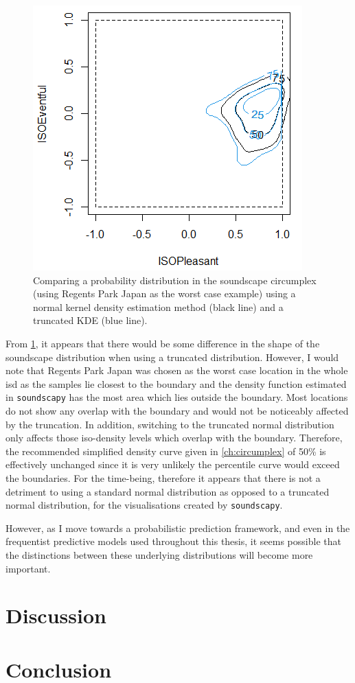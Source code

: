 \begin{figure}
  \centering
  \includegraphics{Figures/Trunc-Normal-demo.png}
  \caption{Comparing a probability distribution in the soundscape circumplex (using Regents Park Japan as the worst case example) using a normal kernel density estimation method (black line) and a truncated KDE (blue line). \label{fig:truncatekde}}
\end{figure}

From \cref{fig:truncatekde}, it appears that there would be some difference in the shape of the soundscape distribution when using a truncated distribution. However, I would note that Regents Park Japan was chosen as the worst case location in the whole \gls{isd} as the samples lie closest to the boundary and the density function estimated in \texttt{soundscapy} has the most area which lies outside the boundary. Most locations do not show any overlap with the boundary and would not be noticeably affected by the truncation. In addition, switching to the truncated normal distribution only affects those iso-density levels which overlap with the boundary. Therefore, the recommended simplified density curve given in \cref{ch:circumplex} of 50\% is effectively unchanged since it is very unlikely the  percentile curve would exceed the boundaries. For the time-being, therefore it appears that there is not a detriment to using a standard normal distribution as opposed to a truncated normal distribution, for the visualisations created by \texttt{soundscapy}.

However, as I move towards a probabilistic prediction framework, and even in the frequentist predictive models used throughout this thesis, it seems possible that the distinctions between these underlying distributions will become more important. 


\section{Discussion}

\section{Conclusion}

